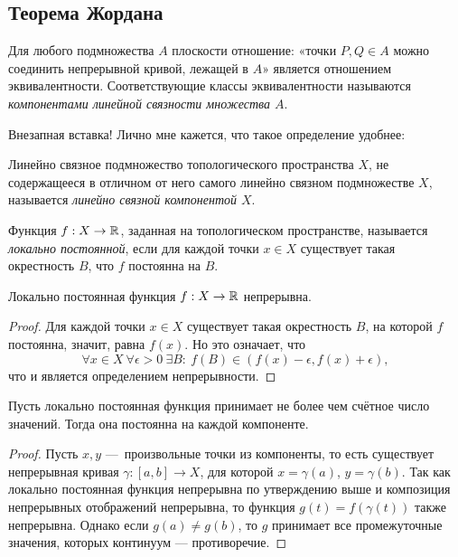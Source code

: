 \subsection{Теорема Жордана}
\begin{definition}
    Для любого подмножества $A$ плоскости отношение: «точки $P,Q \in A$ можно соединить непрерывной кривой, лежащей в $A$» является отношением эквивалентности. Соответствующие классы эквивалентности называются \textit{компонентами линейной связности множества $A$}.
\end{definition}

Внезапная вставка! Лично мне кажется, что такое определение удобнее:
\begin{definition}
    Линейно связное подмножество топологического пространства $X$, не содержащееся в отличном от него самого линейно связном подмножестве $X$, называется \textit{линейно связной компонентой $X$}.
\end{definition} 

\begin{definition}
    Функция $f: X \to \mathbb{R}$, заданная на топологическом пространстве, называется \textit{локально постоянной}, если для каждой точки $x \in X$ существует такая окрестность $B$, что $f$ постоянна на $B$.
\end{definition} 

\begin{statement}
    Локально постоянная функция $f: X \to \mathbb{R}$ непрерывна.
\end{statement} 
\begin{proof}
    Для каждой точки $x \in X$ существует такая окрестность $B$, на которой $f$ постоянна, значит, равна $f(x)$. Но это означает, что
    \[\forall x \in X \ \forall \epsilon > 0 \ \exists B: \ f(B) \in (f(x) - \epsilon, f(x) + \epsilon),\]
    что и является определением непрерывности.
\end{proof} 

\begin{statement}
    Пусть локально постоянная функция принимает не более чем счётное число значений. Тогда она постоянна на каждой компоненте.
\end{statement} 
\begin{proof}
    Пусть $x,y$ — произвольные точки из компоненты, то есть существует непрерывная кривая $\gamma: [a,b] \to X$, для которой $x = \gamma(a)$, $y = \gamma(b)$. Так как локально постоянная функция непрерывна по утверждению выше и композиция непрерывных отображений непрерывна, то функция $g(t) = f(\gamma(t))$ также непрерывна. Однако если $g(a) \neq g(b)$, то $g$ принимает все промежуточные значения, которых континуум — противоречие.
\end{proof} 


